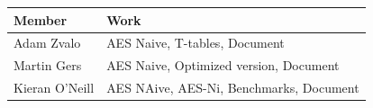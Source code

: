 
\begin{table}[H]
    \centering
    \begin{tabular}{|p{3cm}|p{8cm}|}
    \hline
        \textbf{Member} & \textbf{Work} \\ \hline \hline
        Adam Zvalo & AES Naive, T-tables, Document \\ \hline
        Martin Gers & AES Naive, Optimized version, Document \\ \hline
        Kieran O'Neill & AES NAive, AES-Ni, Benchmarks, Document \\ \hline
    \end{tabular}
    \label{tab:contributions}
\end{table}